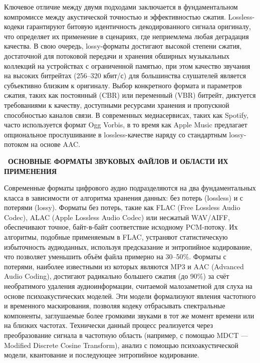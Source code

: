 \documentclass{SibFU-docs}
\begin{document}

Ключевое отличие между двумя подходами заключается в фундаментальном компромиссе между акустической точностью и эффективностью сжатия. Lossless-кодеки гарантируют битовую идентичность декодированного сигнала оригиналу, что определяет их применение в сценариях, где неприемлема любая деградация качества. В свою очередь, lossy-форматы достигают высокой степени сжатия, достаточной для потоковой передачи и хранения обширных музыкальных коллекций на устройствах с ограниченной памятью, при этом качество звучания на высоких битрейтах (256–320 кбит/с) для большинства слушателей является субъективно близким к оригиналу. Выбор конкретного формата и параметров сжатия, таких как постоянный (CBR) или переменный (VBR) битрейт, диктуется требованиями к качеству, доступными ресурсами хранения и пропускной способностью каналов связи. В современных медиасервисах, таких как Spotify, часто используется формат Ogg Vorbis, в то время как Apple Music предлагает опциональное прослушивание в lossless-качестве наряду со стандартным lossy-потоком на основе AAC.

\newpage
{}
\begin{center}\textbf{\thesection\ ОСНОВНЫЕ ФОРМАТЫ ЗВУКОВЫХ ФАЙЛОВ И ОБЛАСТИ ИХ ПРИМЕНЕНИЯ}\end{center}
\vspace*{-1.5em}

Современные форматы цифрового аудио подразделяются на два фундаментальных класса в зависимости от алгоритма хранения данных: без потерь (lossless) и с потерями (lossy). Форматы без потерь, такие как FLAC (Free Lossless Audio Codec), ALAC (Apple Lossless Audio Codec) или несжатый WAV/AIFF, обеспечивают точное, байт-в-байт соответствие исходному PCM-потоку. Их алгоритмы, подобные применяемым в FLAC, устраняют статистическую избыточность аудиоданных, используя предсказание и энтропийное кодирование, что позволяет уменьшить объём файла примерно на 30–50\%. Форматы с потерями, наиболее известными из которых являются MP3 и AAC (Advanced Audio Coding), достигают радикально большего сжатия (до 90\%) за счёт необратимого удаления аудиоинформации, считаемой малозаметной для слуха на основе психоакустических моделей. Эти модели формализуют явления частотного и временного маскирования, позволяя кодеку отбрасывать спектральные компоненты, заглушаемые более громкими звуками в тот же момент времени или на близких частотах. Технически данный процесс реализуется через преобразование сигнала в частотную область (например, с помощью MDCT — Modified Discrete Cosine Transform), анализ с помощью психоакустической модели, квантование и последующее энтропийное кодирование.
\end{document}
